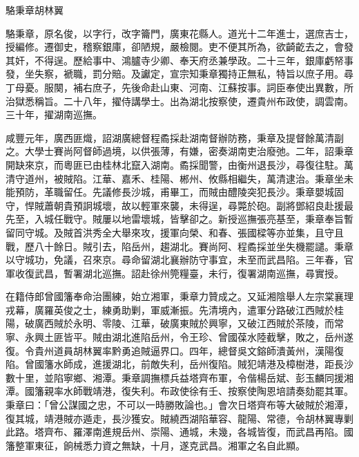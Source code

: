
\begin{pinyinscope}
駱秉章胡林翼

駱秉章，原名俊，以字行，改字籥門，廣東花縣人。道光十二年進士，選庶吉士，授編修。遷御史，稽察銀庫，卻陋規，嚴檢閱。吏不便其所為，欲齮齕去之，會發其奸，不得逞。歷給事中、鴻臚寺少卿、奉天府丞兼學政。二十三年，銀庫虧帑事發，坐失察，褫職，罰分賠。及讞定，宣宗知秉章獨持正無私，特旨以庶子用。尋丁母憂。服闋，補右庶子，先後命赴山東、河南、江蘇按事。詞臣奉使出異數，所治獄悉稱旨。二十八年，擢侍講學士。出為湖北按察使，遷貴州布政使，調雲南。三十年，擢湖南巡撫。

咸豐元年，廣西匪熾，詔湖廣總督程矞採赴湖南督辦防務，秉章及提督餘萬清副之。大學士賽尚阿督師過境，以供張薄，有嫌，密奏湖南吏治廢弛。二年，詔秉章開缺來京，而粵匪已由桂林北竄入湖南。矞採聞警，由衡州退長沙，尋復往駐。萬清守道州，被賊陷。江華、嘉禾、桂陽、郴州、攸縣相繼失，萬清逮治。秉章坐未能預防，革職留任。先議修長沙城，甫畢工，而賊由醴陵突犯長沙。秉章嬰城固守，悍賊蕭朝貴預詗城壞，故以輕軍來襲，未得逞，尋斃於砲。副將鄧紹良赴援最先至，入城任戰守。賊屢以地雷壞城，皆擊卻之。新授巡撫張亮基至，秉章奉旨暫留同守城。及賊首洪秀全大舉來攻，援軍向榮、和春、張國樑等亦並集，且守且戰，歷八十餘日。賊引去，陷岳州，趨湖北。賽尚阿、程矞採並坐失機罷譴。秉章以守城功，免議，召來京。尋命留湖北襄辦防守事宜，未至而武昌陷。三年春，官軍收復武昌，暫署湖北巡撫。詔赴徐州筦糧臺，未行，復署湖南巡撫，尋實授。

在籍侍郎曾國籓奉命治團練，始立湘軍，秉章力贊成之。又延湘陰舉人左宗棠襄理戎幕，廣羅英俊之士，練勇助剿，軍威漸振。先清境內，遣軍分路破江西賊於桂陽，破廣西賊於永明、零陵、江華，破廣東賊於興寧，又破江西賊於茶陵，而常寧、永興土匪皆平。賊由湖北進陷岳州，令王珍、曾國葆水陸截擊，敗之，岳州遂復。令貴州道員胡林翼率黔勇追賊逼界口。四年，總督吳文鎔師潰黃州，漢陽復陷。曾國籓水師成，進援湖北，前敵失利，岳州復陷。賊犯靖港及樟樹港，距長沙數十里，並陷寧鄉、湘潭。秉章調撫標兵益塔齊布軍，令偕楊岳斌、彭玉麟同援湘潭。國籓親率水師戰靖港，復失利。布政使徐有壬、按察使陶恩培請奏劾罷其軍。秉章曰：「曾公謀國之忠，不可以一時勝敗論也。」會次日塔齊布等大破賊於湘潭，復其城，靖港賊亦遁走，長沙獲安。賊繞西湖陷華容、龍陽、常德，令胡林翼專剿此路。塔齊布、羅澤南進規岳州、崇陽、通城，未幾，各城皆復，而武昌再陷。國籓整軍東征，餉械悉力資之無缺，十月，遂克武昌。湘軍之名自此顯。


\end{pinyinscope}
